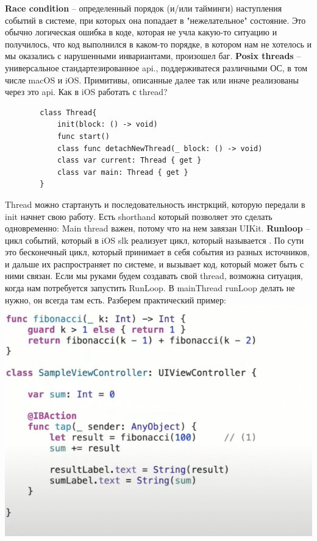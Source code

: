\documentclass{article}
\begin{document}
    \textbf{Race condition} -- определенный порядок (и/или тайминги) наступления событий в системе, при которых она попадает в "нежелательное" состояние. Это обычно логическая ошибка в коде, которая не учла какую-то ситуацию и получилось, что код выполнился в каком-то порядке, в котором нам не хотелось и мы оказались с нарушенными инвариантами, произошел баг. 
    \newline
    \textbf{Posix threads} -- универсальное стандартезированное api., поддерживатеся различными ОС, в том числе macOS и iOS. Примитивы, описанные далее так или иначе реализованы через это api.
    \newline
    Как в iOS работать с thread? 
    \begin{verbatim}
        class Thread{
            init(block: () -> void)
            func start()
            class func detachNewThread(_ block: () -> void)
            class var current: Thread { get }
            class var main: Thread { get }
        }
    \end{verbatim}
    Thread можно стартануть и последовательность инстркций, которую передали в init начнет свою работу. 
    \newline
    Есть shorthand который позволяет это сделать одновременно: 
    \newline
    Main thread важен, потому что на нем завязан UIKit. 
    \newline
    \textbf{Runloop} -- цикл событий, который в iOS slk реализует цикл, который называется . По сути это бесконечный цикл, который принимает в себя события из разных источников, и дальше их распространяет по системе, и вызывает код, который может быть с ними связан. 
    \newline
    Если мы руками будем создавать свой thread, возможна ситуация, когда нам потребуется запустить RunLoop. В mainThread runLoop делать не нужно, он всегда там есть. 
    \newline
    \newline
    Разберем практический пример: 
    \newline
    \includegraphics[scale = 0.5]{pic/Снимок экрана 2023-08-04 в 11.44.02.png}
\end{document}
